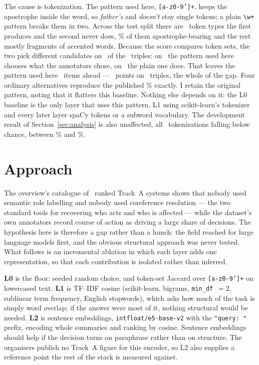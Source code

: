 \documentclass[11pt,letterpaper,twocolumn]{article}
\begin{document}
The cause is tokenization. The pattern used here,
\texttt{[a-z0-9']+}, keeps the apostrophe inside the word, so \emph{father's}
and \emph{doesn't} stay single tokens; a plain \texttt{\textbackslash w+}
pattern breaks them in two.
Across the test split there are \JaccardDiffTypes\ token types the first
produces and the second never does, \JaccardDiffApostPct\% of them
apostrophe-bearing and the rest mostly fragments of accented words. Because the score compares token
sets, the two pick different candidates on \JaccardFlipN\ of the \TestN\
triples: on \JaccardFlipFor\ the pattern used here chooses what the annotators
chose, on \JaccardFlipAgainst\ the plain one does. That leaves the pattern used
here \JaccardGapItems\ items ahead --- \JaccardGapPts\ points on \TestN\
triples, the whole of the gap. Four ordinary alternatives reproduce the published
\PublishedJaccardTest\% exactly. I retain the original pattern, noting that it
flatters this baseline. Nothing else depends on it: the L0 baseline is the only
layer that uses this pattern, L1 using scikit-learn's tokenizer and every later
layer spaCy tokens or a subword vocabulary. The development result of
Section~\ref{sec:analysis} is also unaffected, all \JaccardVariantsN\
tokenizations falling below chance, between \JaccardMinVariant\% and
\JaccardMaxVariant\%.

\section{Approach}\label{sec:approach}
The overview's catalogue of \OfficialRankedA\ ranked Track~A systems shows that
nobody used semantic role labelling and nobody used coreference resolution
\citep{hatzel2026} --- the two standard tools for recovering who acts and who is
affected --- while the dataset's own annotators record course of action as
driving a large share of decisions. The hypothesis here is therefore a gap
rather than a hunch: the field reached for large language models first, and the
obvious structural approach was never tested. What follows is an incremental
ablation in which each layer adds one representation, so that each
contribution is isolated rather than inferred.

\textbf{L0} is the floor: seeded random choice, and token-set Jaccard over
\texttt{[a-z0-9']+} on lowercased text. \textbf{L1} is TF--IDF cosine
(scikit-learn, bigrams, \texttt{min\_df}~$=2$, sublinear term frequency,
English stopwords), which asks how much of the task is simply word overlap; if
the answer were most of it, nothing structural would be needed. \textbf{L2} is
sentence embeddings, \texttt{intfloat/e5-base-v2} \citep{e5} with the
\texttt{"query: "} prefix, encoding whole summaries and ranking by cosine.
Sentence embeddings should help if the decision turns on paraphrase rather than
on structure. The organisers publish no Track~A figure for this encoder, so L2
also supplies a reference point the rest of the stack is measured against.
\end{document}
